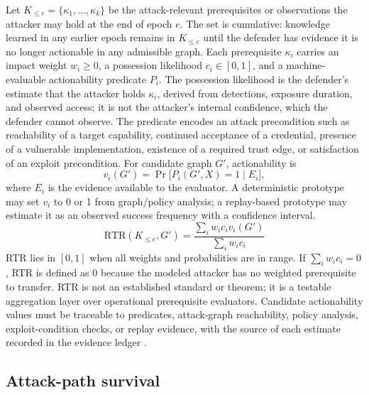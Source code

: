 \documentclass[11pt,letterpaper]{article}
\begin{document}
Let $K_{\le e}=\{\kappa_1,\dots,\kappa_k\}$ be the attack-relevant prerequisites or observations the attacker may hold at the end of epoch $e$. The set is cumulative: knowledge learned in any earlier epoch remains in $K_{\le e}$ until the defender has evidence it is no longer actionable in any admissible graph. Each prerequisite $\kappa_i$ carries an impact weight $w_i\ge0$, a possession likelihood $c_i\in[0,1]$, and a machine-evaluable actionability predicate $P_i$. The possession likelihood is the defender's estimate that the attacker holds $\kappa_i$, derived from detections, exposure duration, and observed access; it is not the attacker's internal confidence, which the defender cannot observe. The predicate encodes an attack precondition such as reachability of a target capability, continued acceptance of a credential, presence of a vulnerable implementation, existence of a required trust edge, or satisfaction of an exploit precondition. For candidate graph $G'$, actionability is
\begin{equation}\label{eq:v}
v_i(G')=\Pr\big[P_i(G',X)=1\mid E_i\big],
\end{equation}
where $E_i$ is the evidence available to the evaluator. A deterministic prototype may set $v_i$ to 0 or 1 from graph/policy analysis; a replay-based prototype may estimate it as an observed success frequency with a confidence interval.
\begin{equation}\label{eq:rtr}
\mathrm{RTR}(K_{\le e},G')=\frac{\sum_i w_i c_i v_i(G')}{\sum_i w_i c_i}
\end{equation}
RTR lies in $[0,1]$ when all weights and probabilities are in range. If $\sum_i w_ic_i=0$, RTR is defined as 0 because the modeled attacker has no weighted prerequisite to transfer. RTR is not an established standard or theorem; it is a testable aggregation layer over operational prerequisite evaluators. Candidate actionability values must be traceable to predicates, attack-graph reachability, policy analysis, exploit-condition checks, or replay evidence, with the source of each estimate recorded in the evidence ledger \cite{sharma2020metrics,ou2005mulval}.

\subsection{Attack-path survival}
\end{document}
